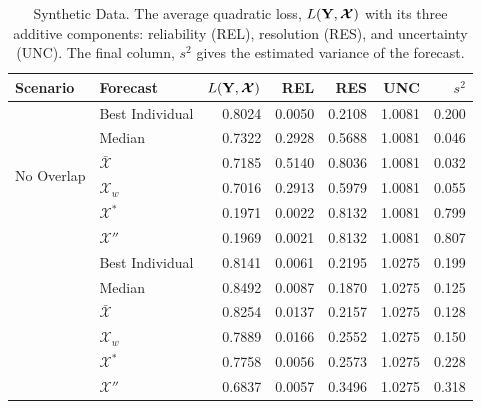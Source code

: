 \documentclass[12pt]{article}
\theoremstyle{definition}
\theoremstyle{definition}
\def\Y{{\bf Y}}
\begin{document}
\begin{table}[t!]
\centering
\caption{Synthetic Data. The average quadratic loss, $L(\Y,\boldsymbol{\mathcal{X}} )$ with its three additive components: reliability (REL), resolution (RES), and uncertainty (UNC). The final column, $s^2$ gives the estimated variance of the forecast.} 
\begin{tabular}{llrrrrr}
  \hline \hline
Scenario & Forecast & $L(\Y,\boldsymbol{\mathcal{X}} )$ & REL & RES & UNC & $s^2$ \\ 
  \hline
 \multirow{6}{*}{No Overlap} & Best Individual & 0.8024 & 0.0050 & 0.2108 & 1.0081 & 0.200\\ 
  & Median & 0.7322 & 0.2928 & 0.5688 & 1.0081& 0.046\\ 
  & $\bar{\mathcal{X}}$ & 0.7185 & 0.5140 & 0.8036 & 1.0081 & 0.032\\ 
  & $\mathcal{X}_w$ & 0.7016 & 0.2913 & 0.5979 & 1.0081 & 0.055\\ 
  & $\mathcal{X}^*$  & 0.1971 & 0.0022 & 0.8132 & 1.0081& 0.799\\ 
  & $\mathcal{X}''$ & 0.1969 & 0.0021 & 0.8132 & 1.0081 & 0.807\\ \rule{0pt}{2.9ex} 
  \multirow{6}{*}{High Overlap} &  Best Individual & 0.8141 & 0.0061 & 0.2195 & 1.0275 &0.199\\ 
  & Median & 0.8492 & 0.0087 & 0.1870 & 1.0275 &0.125 \\ 
  & $\bar{\mathcal{X}}$ & 0.8254 & 0.0137 & 0.2157 & 1.0275 &0.128\\ 
  & $\mathcal{X}_w$ & 0.7889 & 0.0166 & 0.2552 & 1.0275 &0.150 \\ 
  & $\mathcal{X}^*$  & 0.7758 & 0.0056 & 0.2573 & 1.0275 &0.228 \\ 
  &$\mathcal{X}''$ & 0.6837 & 0.0057 & 0.3496 & 1.0275 &0.318 \\ 
   \hline
\end{tabular}
\label{scenA}
\end{table}
\end{document}
